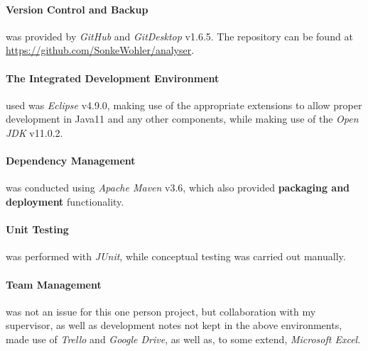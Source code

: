 \documentclass[main.tex]{subfiles}
\begin{document}
        \paragraph{Version Control and Backup} was provided by \textit{GitHub} and \textit{GitDesktop} v1.6.5. The repository can be found at \href{https://github.com/SonkeWohler/analyser}{https://github.com/SonkeWohler/analyser}.
        
        \paragraph{The Integrated Development Environment} used was \textit{Eclipse} v4.9.0, making use of the appropriate extensions to allow proper development in Java11 and any other components, while making use of the \textit{Open JDK} v11.0.2.
        
        \paragraph{Dependency Management} was conducted using \textit{Apache Maven} v3.6, which also provided \textbf{packaging and deployment} functionality.
        
        \paragraph{Unit Testing} was performed with \textit{JUnit}, while conceptual testing was carried out  manually.
        
        \paragraph{Team Management} was not an issue for this one person project, but collaboration with my supervisor, as well as development notes not kept in the above environments, made use of \textit{Trello} and \textit{Google Drive}, as well as, to some extend, \textit{Microsoft Excel}.
        
        
    
\end{document}
